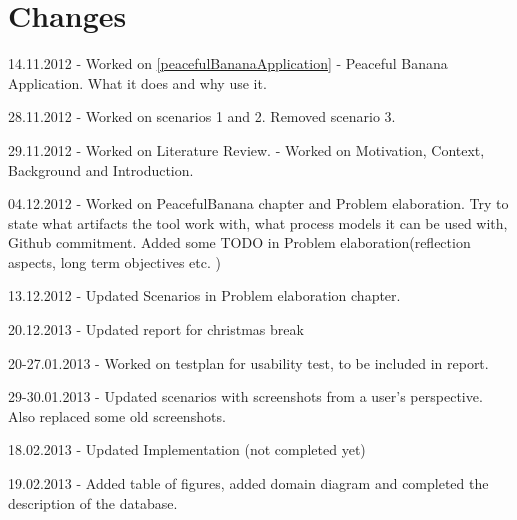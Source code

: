 \chapter*{Changes}
\begin{description}
\item 14.11.2012 - Worked on \autoref{peacefulBananaApplication} - Peaceful Banana Application. What it does and why use it.
\item 28.11.2012 - Worked on scenarios 1 and 2. Removed scenario 3. 
\item 29.11.2012 - Worked on Literature Review. - Worked on Motivation, Context, Background and Introduction. 
\item 04.12.2012 - Worked on PeacefulBanana chapter and Problem elaboration. Try to state what artifacts the tool work with, what process models it can be used with, Github commitment. Added some TODO in Problem elaboration(reflection aspects, long term objectives etc. )
\item 13.12.2012 - Updated Scenarios in Problem elaboration chapter. 
\item 20.12.2013 - Updated report for christmas break
\item 20-27.01.2013 - Worked on testplan for usability test, to be included in report. 
\item 29-30.01.2013 - Updated scenarios with screenshots from a user's perspective. Also replaced some old screenshots. 
\item 18.02.2013 - Updated Implementation (not completed yet)
\item 19.02.2013 - Added table of figures, added domain diagram and completed the description of the database.
\end{description}